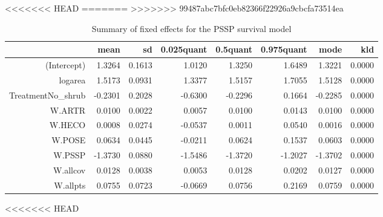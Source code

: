 <<<<<<< HEAD
=======
>>>>>>> 99487abc7bfc0eb82366f22926a9cbcfa73514ea
\begin{table}[ht]
\centering
\caption{Summary of fixed effects for the PSSP survival model} 
\label{PSSPsurvival}
\begin{tabular}{rrrrrrrr}
  \hline
 & mean & sd & 0.025quant & 0.5quant & 0.975quant & mode & kld \\ 
  \hline
(Intercept) & 1.3264 & 0.1613 & 1.0120 & 1.3250 & 1.6489 & 1.3221 & 0.0000 \\ 
  logarea & 1.5173 & 0.0931 & 1.3377 & 1.5157 & 1.7055 & 1.5128 & 0.0000 \\ 
  TreatmentNo\_shrub & -0.2301 & 0.2028 & -0.6300 & -0.2296 & 0.1664 & -0.2285 & 0.0000 \\ 
  W.ARTR & 0.0100 & 0.0022 & 0.0057 & 0.0100 & 0.0143 & 0.0100 & 0.0000 \\ 
  W.HECO & 0.0008 & 0.0274 & -0.0537 & 0.0011 & 0.0540 & 0.0016 & 0.0000 \\ 
  W.POSE & 0.0634 & 0.0445 & -0.0211 & 0.0624 & 0.1537 & 0.0603 & 0.0000 \\ 
  W.PSSP & -1.3730 & 0.0880 & -1.5486 & -1.3720 & -1.2027 & -1.3702 & 0.0000 \\ 
  W.allcov & 0.0128 & 0.0038 & 0.0053 & 0.0128 & 0.0202 & 0.0127 & 0.0000 \\ 
  W.allpts & 0.0755 & 0.0723 & -0.0669 & 0.0756 & 0.2169 & 0.0759 & 0.0000 \\ 
   \hline
\end{tabular}
\end{table}
<<<<<<< HEAD

